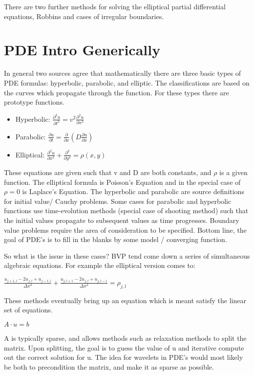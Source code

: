 \documentclass[11pt]{article}
\begin{document}
There are two further methods for solving the elliptical partial differential equations, Robbins and cases of irregular boundaries.

\section {PDE Intro Generically}
In general two sources agree that mathematically there are three basic types of PDE formulas: hyperbolic, parabolic, and elliptic.  The classifications are based on the curves which propagate through the function.  For these types there are prototype functions.  
\begin{itemize}
\item Hyperbolic: $\frac{\partial ^2 u}{\partial t^2} = v^2 \frac{\partial ^2 u}{\partial x^2}$
\item Parabolic: $ \frac{\partial  u}{\partial t} = \frac{\partial}{\partial x} (D \frac{\partial u}{\partial x}) $
\item Elliptical:  $\frac {\partial ^2 u}{\partial x^2} + \frac {\partial^2}{\partial y^2} = \rho (x,y) $
\end{itemize}
These equations are given such that v and D are both constants, and $\rho$ is a given function.  The elliptical formula is Poisson's Equation and in the special case of $\rho = 0$ is Laplace's Equation.  The hyperbolic and parabolic are source definitions for initial value/ Cauchy problems.  Some cases for parabolic and hyperbolic functions use time-evolution methods (special case of shooting method) such that the initial values propagate to subsequent values as time progresses.  Boundary value problems require the area of consideration to be specified.    Bottom line, the goal of PDE's is to fill in the blanks by some model / converging function.  

So what is the issue in these cases?  BVP tend come down a series of simultaneous algebraic equations.  For example the elliptical version comes to:

$\frac{u_{j+1,l} - 2u_{j,l} +u_{j-1,l}}{\Delta x^2 }  + \frac{u_{j,l+1} - 2u_{j,l} +u_{j,l-1}}{\Delta x^2} = \rho_{j,l}$



These methods eventually bring up an equation which is meant satisfy the linear set of equations.  

$A \cdot u = b $

A is typically sparse, and allows methods such as relaxation methods to split the matrix.  Upon splitting, the goal is to guess the value of u and iterative compute out the correct solution for u.  The idea for wavelets in PDE's would most likely be both to precondition the matrix, and make it as sparse as possible.
\end{document}
